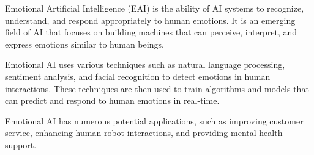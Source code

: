 Emotional Artificial Intelligence (EAI) is the ability of AI systems to recognize, understand, and respond appropriately to human emotions. It is an emerging field of AI that focuses on building machines that can perceive, interpret, and express emotions similar to human beings. 

Emotional AI uses various techniques such as natural language processing, sentiment analysis, and facial recognition to detect emotions in human interactions. These techniques are then used to train algorithms and models that can predict and respond to human emotions in real-time.

Emotional AI has numerous potential applications, such as improving customer service, enhancing human-robot interactions, and providing mental health support.